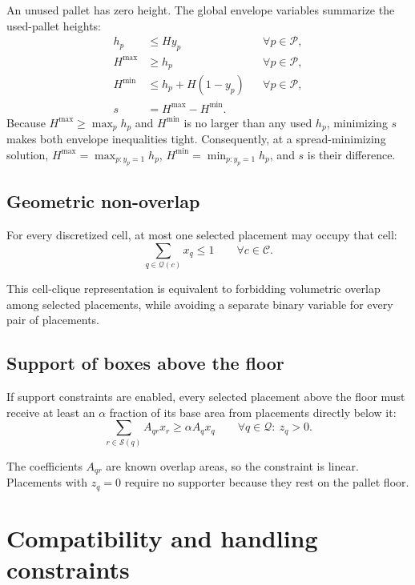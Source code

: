 \documentclass[11pt]{article}
\newcommand{\Pallet}{\mathcal{P}}
\newcommand{\Place}{\mathcal{Q}}
\newcommand{\Cell}{\mathcal{C}}
\newcommand{\Support}{\mathcal{S}}
\begin{document}
An unused pallet has zero height.  The global envelope variables summarize the
used-pallet heights:
\begin{align}
  h_p &\le H y_p && \forall p\in\Pallet,\\
  H^{\max} &\ge h_p && \forall p\in\Pallet,\\
  H^{\min} &\le h_p + H(1-y_p) && \forall p\in\Pallet,\\
  s &= H^{\max}-H^{\min}. &&
  \label{eq:height-spread}
\end{align}
Because $H^{\max}\ge\max_p h_p$ and $H^{\min}$ is no larger than any used
$h_p$, minimizing $s$ makes both envelope inequalities tight.  Consequently,
at a spread-minimizing solution, $H^{\max}=\max_{p:y_p=1}h_p$,
$H^{\min}=\min_{p:y_p=1}h_p$, and $s$ is their difference.

\subsection{Geometric non-overlap}

For every discretized cell, at most one selected placement may occupy that
cell:
\begin{equation}
  \sum_{q\in\Place(c)}x_q\le 1
  \qquad \forall c\in\Cell.
  \label{eq:nonoverlap}
\end{equation}

This cell-clique representation is equivalent to forbidding volumetric overlap
among selected placements, while avoiding a separate binary variable for every
pair of placements.

\subsection{Support of boxes above the floor}

If support constraints are enabled, every selected placement above the floor
must receive at least an $\alpha$ fraction of its base area from placements
directly below it:
\begin{equation}
  \sum_{r\in\Support(q)} A_{qr}x_r
  \ge \alpha A_q x_q
  \qquad \forall q\in\Place:\ z_q>0.
  \label{eq:support}
\end{equation}

The coefficients $A_{qr}$ are known overlap areas, so the constraint is
linear.  Placements with $z_q=0$ require no supporter because they rest on the
pallet floor.

\section{Compatibility and handling constraints}
\end{document}
